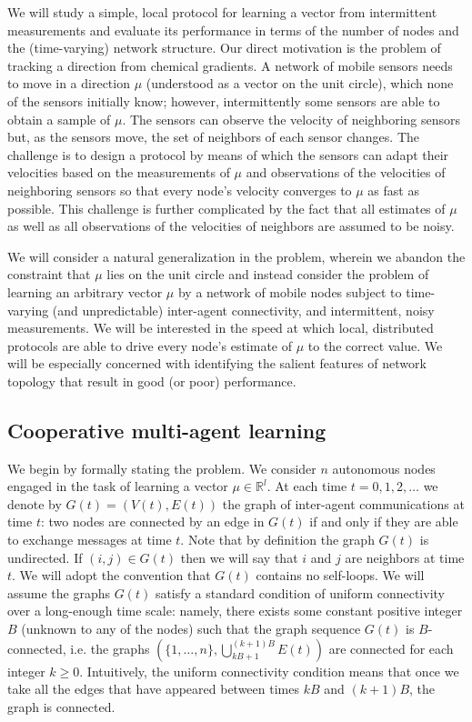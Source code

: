 \documentclass[final]{siamltex}
\begin{document}
{{{We will study a simple, local protocol for learning a vector from intermittent
measurements and evaluate its performance in terms of the number of nodes and the (time-varying) network structure.}}} Our
 direct motivation is the problem of tracking a direction from chemical gradients. A network of 
mobile sensors needs to move in a direction $\mu$ (understood as a vector on the unit circle), which none 
of the sensors initially know; however, intermittently some sensors are able to obtain a sample of $\mu$. The sensors
can observe the velocity of neighboring sensors but, as the sensors move, the set of neighbors of each sensor changes.  The challenge
is to design a protocol by means of which the sensors can adapt their velocities based on the measurements 
of $\mu$ and observations of the velocities of neighboring sensors so that every node's velocity converges to $\mu$ as 
fast as possible. This challenge is further complicated by the fact that all estimates of $\mu$ as well as all 
observations of the velocities of neighbors
are assumed to be noisy. 

We will consider a natural generalization in the problem, {{{wherein we abandon the constraint that $\mu$ lies on the
unit circle}}} and instead consider the problem of learning an arbitrary vector $\mu$ by a network of mobile nodes subject to time-varying (and unpredictable) inter-agent connectivity, and intermittent, noisy measurements. {{{We will be interested in the speed at which
local, distributed protocols are able to drive every node's estimate of $\mu$ to the correct value. We will be especially concerned with identifying the salient 
features of network topology that result in good (or poor) performance.}}}   

\subsection{Cooperative multi-agent learning}

We begin by formally stating the problem. We consider $n$ autonomous nodes engaged in the task of learning a vector $\mu \in \mathbb{R}^l$. At each time  $t=0,1,2,\ldots$ we denote by $G(t)=(V(t),E(t))$ the graph of inter-agent communications at time $t$:
two nodes are connected by an edge in $G(t)$ if and only if they are able to exchange messages at time $t$. Note that by definition the graph $G(t)$ is undirected. If $(i,j) \in G(t)$ then we will say that $i$ and $j$ are neighbors at time $t$. We will adopt the convention that $G(t)$ contains no self-loops. We will assume the graphs $G(t)$ satisfy a standard condition of uniform connectivity over a long-enough 
time scale: namely, there exists some 
constant positive integer $B$ (unknown to any of the nodes) such that the graph sequence $G(t)$ is $B$-connected, i.e. the graphs $(\{1,\ldots,n\}, \bigcup_{kB+1}^{(k+1)B} E(t) )$ are connected for each
integer $k \geq 0$. {{{Intuitively, the uniform connectivity condition means that once we take all the edges that have appeared between times $kB$ and $(k+1)B$, the graph is connected}}}.
\end{document}
